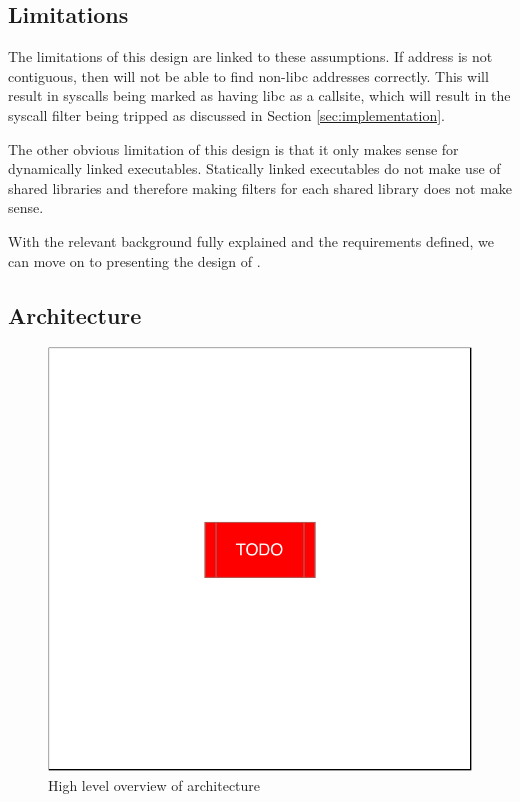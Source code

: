 
\subsection{Limitations}

The limitations of this design are linked to these assumptions. If 
address is not contiguous, then \af will not be able to find non-\ac{libc}
addresses correctly. This will result in syscalls being marked as having 
\ac{libc} as a callsite, which will result in the syscall filter being
tripped as discussed in Section \ref{sec:implementation}. 

The other obvious limitation of this design is that it only makes sense for
dynamically linked executables. Statically linked executables do not make use of
shared libraries and therefore making filters for each shared library does not
make sense.

With the relevant background fully explained and the requirements defined, we
can move on to presenting the design of \afss.~ 

\subsection{Architecture} \label{subsec:arch}

\begin{figure}[ht]
    \centering
    \includegraphics[width=0.8 \linewidth]{./diagrams/TODO.pdf} 
    \caption{High level overview of \afg architecture}
    \label{fig:arch-overview}
\end{figure}

